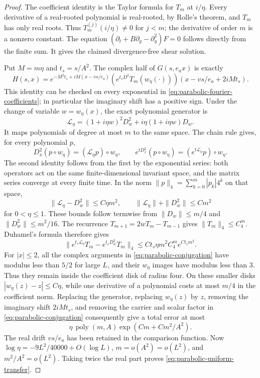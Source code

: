 \begin{proof}
The coefficient identity is the Taylor formula for $T_m$ at $i/\eta$.
Every derivative of a real-rooted polynomial is real-rooted, by Rolle's
theorem, and $T_m$ has only real roots.  Thus $T_m^{(j)}(i/\eta)\ne0$
for $j<m$; the derivative of order $m$ is a nonzero constant.
The equation $(\partial_t+B\partial_y-\partial_y^2)F=0$ follows directly
from the finite sum.  It gives the claimed divergence-free shear solution.

Put $M=m\eta$ and $t_s=s/A^2$.  The complex half of $G(s,e_ax)$ is
exactly
\begin{equation}\label{eq:parabolic-conjugation}
 H(s,x)=e^{-M^2t_s+iM(x-vs/e_a)}
 \left(e^{t_sD^2}T_m(w_\eta(\cdot))\right)
 (x-vs/e_a+2iMt_s).
\end{equation}
This identity can be checked on every exponential in
\eqref{eq:parabolic-fourier-coefficients}; in particular the imaginary
shift has a positive sign.  Under the change of variable $w=w_\eta(x)$,
the exact polynomial generator is
\[
 \mathcal L_\eta=(1+i\eta w)^2D_w^2
                  +i\eta(1+i\eta w)D_w.
\]
It maps polynomials of degree at most $m$ to the same space.
The chain rule gives, for every polynomial $p$,
\[
 D_x^2(p\circ w_\eta)=(\mathcal L_\eta p)\circ w_\eta,
 \qquad
 e^{tD_x^2}(p\circ w_\eta)
       =(e^{t\mathcal L_\eta}p)\circ w_\eta .
\]
The second identity follows from the first by the exponential series:
both operators act on the same finite-dimensional invariant space,
and the matrix series converge at every finite time.
In the norm $\|p\|_4=\sum_{k=0}^m|p_k|4^k$ on that space,
\[
 \|\mathcal L_\eta-D_w^2\|\le C\eta m^2,
 \qquad \|\mathcal L_\eta\|+\|D_w^2\|\le Cm^2
\]
for $0<\eta\le1$.  These bounds follow termwise from
$\|D_w\|\le m/4$ and $\|D_w^2\|\le m^2/16$.
The recurrence $T_{m+1}=2wT_m-T_{m-1}$ gives
$\|T_m\|_4\le C_4^m$.  Duhamel's formula therefore gives
\[
 \|e^{t_s\mathcal L_\eta}T_m-e^{t_sD_w^2}T_m\|_4
 \le C t_s\eta m^2 C_4^m e^{Ct_sm^2}.
\]
For $|x|\le2$, all the complex arguments in
\eqref{eq:parabolic-conjugation} have modulus less than $5/2$ for large
$L$, and their $w_\eta$ images have modulus less than $3$.
Thus they remain inside the coefficient disk of radius four.
On these smaller disks $|w_\eta(z)-z|\le C\eta$, while one derivative
of a polynomial costs at most $m/4$ in the coefficient norm.
Replacing the generator, replacing $w_\eta(z)$ by $z$, removing the
imaginary shift $2iMt_s$, and removing the carrier and scalar factor
in \eqref{eq:parabolic-conjugation} consequently give a total error at
most
\[
 \eta\,\operatorname{poly}(m,A)
       \exp(Cm+Cm^2/A^2).
\]
The real drift $vs/e_a$ has been retained in the comparison function.
Now $\log\eta=-9L^2/40000+O(\log L)$,
$m=o(A^2)=o(L^2)$, and $m^2/A^2=o(L^2)$.
Taking twice the real part proves \eqref{eq:parabolic-uniform-transfer}.
\end{proof}

